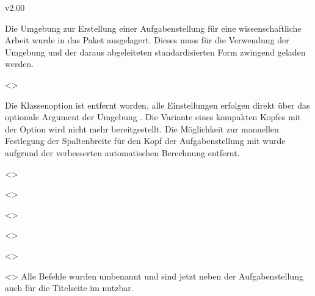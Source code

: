 \begin{Entity}{}
\begin{NoIndexDefault}
\begin{Cessations}{v2.00}
\minisec{\taskname}
%
\begin{Entity}{}
Die Umgebung zur Erstellung einer Aufgabenstellung für eine wissenschaftliche 
Arbeit wurde in das Paket  ausgelagert. Dieses muss 
für die Verwendung der Umgebung  und der daraus abgeleiteten 
standardisierten Form zwingend geladen werden.

\begin{Cessation}
  {}
  <>
\begin{Cessation}
  {}
\begin{Cessation}
  {}
\printdeclarationlist
%
Die Klassenoption  ist entfernt worden, alle Einstellungen 
erfolgen direkt über das optionale Argument der Umgebung . 
Die Variante eines kompakten Kopfes mit der Option  wird 
nicht mehr bereitgestellt. Die Möglichkeit zur manuellen Festlegung der 
Spaltenbreite für den Kopf der Aufgabenstellung mit  wurde 
aufgrund der verbesserten automatischen Berechnung entfernt.
\end{Cessation}
\end{Cessation}
\end{Cessation}

\begin{Cessation}
  {}
  <>
\begin{Cessation}
  {}
  <>
\begin{Cessation}
  {}
  <>
\begin{Cessation}
  {}
  <>
\begin{Cessation}
  {}
  <>
\begin{Cessation}
  {}
  <>
\printdeclarationlist
%
Alle Befehle wurden umbenannt und sind jetzt neben der Aufgabenstellung auch 
für die Titelseite im \CD nutzbar.
\end{Cessation}
\end{Cessation}
\end{Cessation}
\end{Cessation}
\end{Cessation}
\end{Cessation}


\end{Entity}
\end{Cessations}
\end{NoIndexDefault}
\end{Entity}
